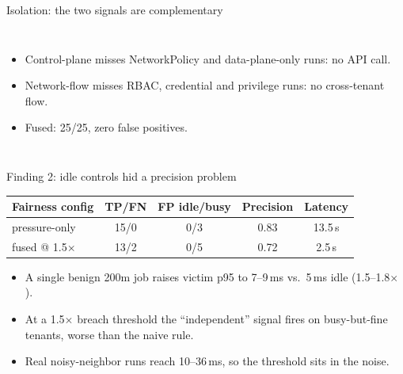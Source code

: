 \documentclass[aspectratio=169,11pt]{beamer}
\begin{document}
\begin{frame}{Isolation: the two signals are complementary}
\begin{columns}[c]
\begin{itemize}
\item Control-plane misses NetworkPolicy and data-plane-only runs: no API call.
\item Network-flow misses RBAC, credential and privilege runs: no cross-tenant flow.
\item \alert{Fused: 25/25, zero false positives.}
\end{itemize}
\end{columns}
\end{frame}

\begin{frame}{Finding 2: idle controls hid a precision problem}
\small
\begin{center}
\begin{tabular}{lcccc}
\toprule
Fairness config & TP/FN & FP idle/busy & Precision & Latency\\
\midrule
pressure-only & 15/0 & 0/3 & 0.83 & 13.5\,s\\
fused @ 1.5$\times$ & 13/2 & 0/\alert{5} & \alert{0.72} & 2.5\,s\\
\bottomrule
\end{tabular}
\end{center}
\normalsize
\begin{itemize}
\item A single benign 200m job raises victim p95 to 7--9\,ms vs.\ 5\,ms idle (1.5--1.8$\times$).
\item At a 1.5$\times$ breach threshold the ``independent'' signal fires on busy-but-fine tenants, \alert{worse than the naive rule}.
\item Real noisy-neighbor runs reach 10--36\,ms, so the threshold sits in the noise.
\end{itemize}
\end{frame}
\end{document}
